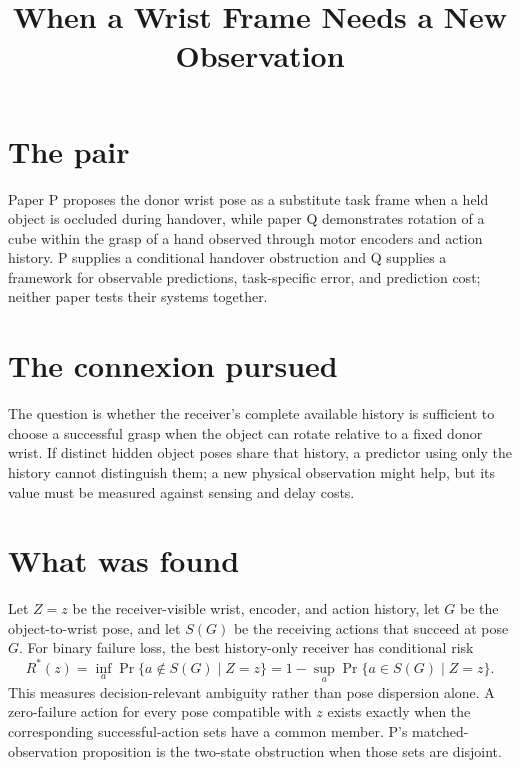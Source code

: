 \documentclass{article}
\title{When a Wrist Frame Needs a New Observation}
\begin{document}
\maketitle

\section{The pair}

Paper P proposes the donor wrist pose as a substitute task frame when a held object is occluded during handover, while paper Q demonstrates rotation of a cube within the grasp of a hand observed through motor encoders and action history. P supplies a conditional handover obstruction and Q supplies a framework for observable predictions, task-specific error, and prediction cost; neither paper tests their systems together. 

\section{The connexion pursued}

The question is whether the receiver's complete available history is sufficient to choose a successful grasp when the object can rotate relative to a fixed donor wrist. If distinct hidden object poses share that history, a predictor using only the history cannot distinguish them; a new physical observation might help, but its value must be measured against sensing and delay costs. 

\section{What was found}

Let \(Z=z\) be the receiver-visible wrist, encoder, and action history, let \(G\) be the object-to-wrist pose, and let \(S(G)\) be the receiving actions that succeed at pose \(G\). For binary failure loss, the best history-only receiver has conditional risk
\[
R^*(z)
 = \inf_a \Pr\{a\notin S(G)\mid Z=z\}
 = 1-\sup_a\Pr\{a\in S(G)\mid Z=z\}.
\]
This measures decision-relevant ambiguity rather than pose dispersion alone. A zero-failure action for every pose compatible with \(z\) exists exactly when the corresponding successful-action sets have a common member. P's matched-observation proposition is the two-state obstruction when those sets are disjoint. 
\end{document}

